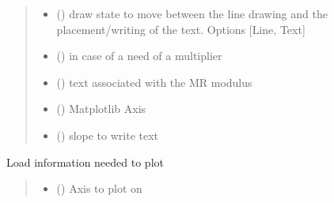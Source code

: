 \documentclass[letterpaper,10pt,english]{sphinxmanual}
\begin{document}
\begin{fulllineitems}
\begin{fulllineitems}
\begin{quote}
\begin{description}
\begin{itemize}
\item {} 
\sphinxAtStartPar
{} () \textendash{} draw state to move between the line drawing and the placement/writing of the text. Options {[}Line, Text{]}

\item {} 
\sphinxAtStartPar
{} () \textendash{} in case of a need of a multiplier

\item {} 
\sphinxAtStartPar
{} () \textendash{} text associated with the MR modulus

\item {} 
\sphinxAtStartPar
{} () \textendash{} Matplotlib Axis

\item {} 
\sphinxAtStartPar
{} () \textendash{} slope to write text

\end{itemize}

\sphinxAtStartPar


\sphinxAtStartPar


\end{description}\end{quote}

\end{fulllineitems}


\begin{fulllineitems}
\label{\detokenize{pyrockmodulus:pyrockmodulus.pyrockmodulus.modulus_ratio.deere_miller_clusters}}
\pysigstartsignatures
{}
\pysigstopsignatures
\sphinxAtStartPar
Load information needed to plot
\begin{quote}\begin{description}
\begin{itemize}
\item {} 
\sphinxAtStartPar
{} () \textendash{} Axis to plot on


\end{itemize}
\end{description}
\end{quote}
\end{fulllineitems}
\end{fulllineitems}
\end{document}
